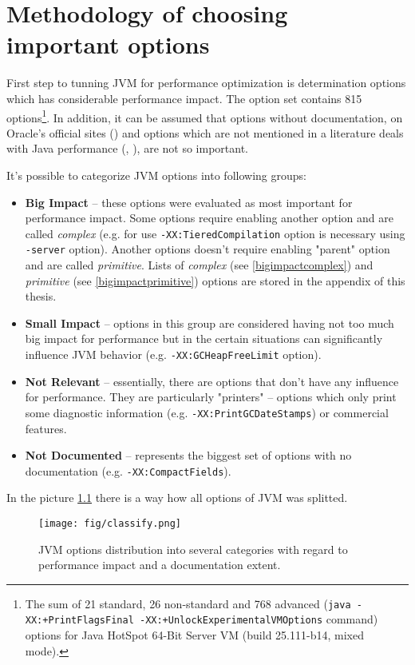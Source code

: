 \documentclass[
  digital, %
  oneside,
  notable, %
  nolof,     %
  nolot     %
]{fithesis3}
\begin{document}
\chapter{Methodology of choosing important options}
First step to tunning JVM for performance optimization is determination options which has considerable performance impact. The option set contains 815 options\footnote{The sum of 21 standard, 26 non-standard and 768 advanced (\texttt{java -XX:+PrintFlagsFinal -XX:+UnlockExperimentalVMOptions} command) options for Java HotSpot\texttrademark{} 64-Bit Server VM (build 25.111-b14, mixed mode).}. In addition, it can be assumed that options without documentation, on Oracle's official sites (\cite{java}) and options which are not mentioned in a literature deals with Java performance (\cite{scott}, \cite{hunt}), are not so important.

It's possible to categorize JVM options into following groups:
\begin{itemize}
	\item \textbf{Big Impact} -- these options were evaluated as most important for performance impact. Some options require enabling another option and are called \textit{complex} (e.g. for use \texttt{-XX:TieredCompilation} option is necessary using \texttt{-server} option). Another options doesn't require enabling "parent" option and are called \textit{primitive}. Lists of \textit{complex} (see \ref{bigimpactcomplex}) and \textit{primitive} (see \ref{bigimpactprimitive}) options are stored in the appendix of this thesis.
	\item \textbf{Small Impact} -- options in this group are considered having not too much big impact for performance but in the certain situations can significantly influence JVM behavior (e.g. \texttt{-XX:GCHeapFreeLimit} option).
	\item \textbf{Not Relevant} -- essentially, there are options that don't have any influence for performance. They are particularly "printers" -- options which only print some diagnostic information (e.g. \texttt{-XX:PrintGCDateStamps}) or commercial features.
	\item \textbf{Not Documented} -- represents the biggest set of options with no documentation (e.g. \texttt{-XX:CompactFields}).
\end{itemize}

In the picture \ref{classify} there is a way how all options of JVM was splitted.

\begin{figure}[h]
	\centering
	\texttt{[image: fig/classify.png]}
	\caption{JVM options distribution into several categories with regard to performance impact and a documentation extent.}
	\label{classify}
\end{figure}
\end{document}
